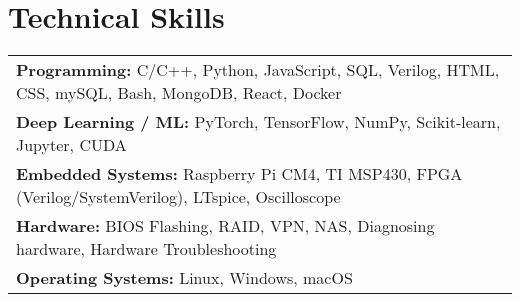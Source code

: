 \documentclass[letterpaper,11pt]{article}
\begin{document}
\section*{Technical Skills}
\begin{tabularx}{\textwidth}{X}
\textbf{Programming:} C/C++, Python, JavaScript, SQL, Verilog, HTML, CSS, mySQL, Bash, MongoDB, React, Docker\\
\textbf{Deep Learning / ML:} PyTorch, TensorFlow, NumPy, Scikit-learn, Jupyter, CUDA \\
\textbf{Embedded Systems:} Raspberry Pi CM4, TI MSP430, FPGA (Verilog/SystemVerilog), LTspice, Oscilloscope\\
\textbf{Hardware:} BIOS Flashing, RAID, VPN, NAS, Diagnosing hardware, Hardware Troubleshooting \\
\textbf{Operating Systems:} Linux, Windows, macOS \\
\end{tabularx}
\end{document}
